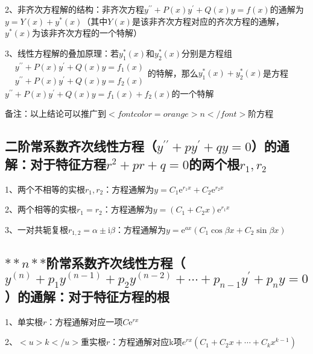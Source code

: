 2、非齐次方程解的结构：非齐次方程$ y^{\prime \prime}+P(x) y^{\prime}+Q(x) y=f(x) $的通解为$ y=Y(x)+y^{*}(x) $（其中$ Y(x) $是该非齐次方程对应的齐次方程的通解，$ y^{*}(x) $为该非齐次方程的一个特解）

3、线性方程解的叠加原理：若$ y_{1}^{*}(x) $和$ y_{2}^{*}(x) $分别是方程组$ \begin{aligned} &y^{\prime \prime}+P(x) y^{\prime}+Q(x) y=f_{1}(x) \\ &y^{\prime \prime}+P(x) y^{\prime}+Q(x) y=f_{2}(x) \end{aligned} $的特解，那么$ y_{1}^{*}(x)+y_{2}^{*}(x) $是方程$ y^{\prime \prime}+P(x) y^{\prime}+Q(x) y=f_{1}(x)+f_{2}(x) $的一个特解

备注：以上结论可以推广到$ <font color=orange>n</font> $阶方程



\subsection{二阶常系数齐次线性方程（$ y^{\prime \prime}+p y^{\prime}+q y=0 $）的通解：对于特征方程$ r^{2}+p r+q=0 $的两个根$  r_{1}, r_{2}  $}

1、两个不相等的实根$ r_{1}, r_{2} $：方程通解为$  y=C_{1} \mathrm{e}^{r_1 x}+C_{2} \mathrm{e}^{r_2 x} $

2、两个相等的实根$ r_{1}=r_{2} $：方程通解为$ y=\left(C_{1}+C_{2} x\right) \mathrm{e}^{r_1 x} $

3、一对共轭复根$ r_{1,2}=\alpha \pm \mathrm{i} \beta $：方程通解为$ y=\mathrm{e}^{a x}\left(C_{1} \cos \beta x+C_{2} \sin \beta x\right) $



\subsection{$ **n** $阶常系数齐次线性方程（$ y^{(n)}+p_{1} y^{(n-1)}+p_{2} y^{(n-2)}+\cdots+p_{n-1} y^{\prime}+p_{n} y=0 $）的通解：对于特征方程的根}

1、单实根$ r $：方程通解对应一项$  C \mathrm{e}^{rx} $

2、$ <u>k</u> $重实根$ r $：方程通解对应k项$ {e}^{r x}\left(C_{1}+C_{2} x+\cdots+C_{k} x^{k-1}\right) $

